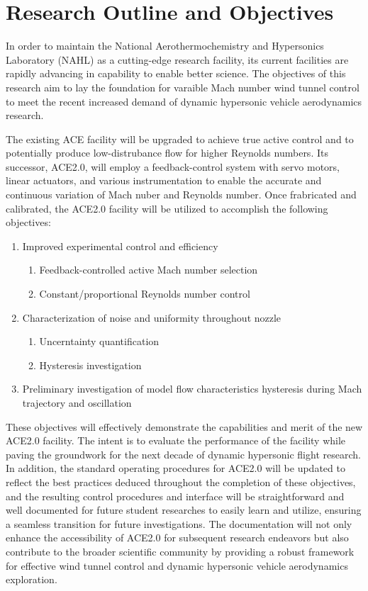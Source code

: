 \section{Research Outline and Objectives}

In order to maintain the National Aerothermochemistry and Hypersonics Laboratory (NAHL) as a cutting-edge research facility, its current facilities are rapidly advancing in capability to enable better science. The objectives of this research aim to lay the foundation for varaible Mach number wind tunnel control to meet the recent increased demand of dynamic hypersonic vehicle aerodynamics research.

The existing ACE facility will be upgraded to achieve true active control and to potentially produce low-distrubance flow for higher Reynolds numbers. Its successor, ACE2.0, will employ a feedback-control system with servo motors, linear actuators, and various instrumentation to enable the accurate and continuous variation of Mach nuber and Reynolds number. Once frabricated and calibrated, the ACE2.0 facility will be utilized to accomplish the following objectives:

\begin{enumerate}
    \item Improved experimental control and efficiency
        \begin{enumerate}
            \item Feedback-controlled active Mach number selection
            \item Constant/proportional Reynolds number control
        \end{enumerate}
    \item Characterization of noise and uniformity throughout nozzle
        \begin{enumerate}
            \item Uncerntainty quantification
            \item Hysteresis investigation
        \end{enumerate}
    \item Preliminary investigation of model flow characteristics hysteresis during Mach trajectory and oscillation
\end{enumerate}

These objectives will effectively demonstrate the capabilities and merit of the new ACE2.0 facility. The intent is to evaluate the performance of the facility while paving the groundwork for the next decade of dynamic hypersonic flight research. In addition, the standard operating procedures for ACE2.0 will be updated to reflect the best practices deduced throughout the completion of these objectives, and the resulting control procedures and interface will be straightforward and well documented for future student researches to easily learn and utilize, ensuring a seamless transition for future investigations. The documentation will not only enhance the accessibility of ACE2.0 for subsequent research endeavors but also contribute to the broader scientific community by providing a robust framework for effective wind tunnel control and dynamic hypersonic vehicle aerodynamics exploration.

